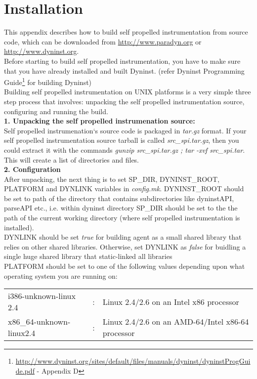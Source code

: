 \section{Installation}
This appendix describes how to build self propelled instrumentation
from source code, which can be downloaded from \url{http://www.paradyn.org}
or \url{http://www.dyninst.org}. \\


Before starting to build self propelled instrumentation, you have to make sure that you have already installed and built Dyninst. (refer Dyninst Programming Guide\footnote{\url{http://www.dyninst.org/sites/default/files/manuals/dyninst/dyninstProgGuide.pdf} - Appendix D} for building Dyninst) \\

Building self propelled instrumentation on UNIX platforms is a very simple three step process that involves: unpacking the self propelled instrumentation source, configuring and running the build. \\

\textbf{1. Unpacking the self propelled instrumenation source:} \\
Self propelled instrumenation`s source code is packaged in \textit{tar.gz} format. If your self propelled instrumentation source tarball is called \textit{src\_spi.tar.gz}, then you could extract it with the commands \textit{gunzip src\_spi.tar.gz ; tar  -xvf src\_spi.tar}. This will create a list of directories and files.  \\

\textbf{2. Configuration} \\
After unpacking, the next thing is to set SP\_DIR, DYNINST\_ROOT, PLATFORM and DYNLINK variables in \textit{config.mk}.  DYNINST\_ROOT should be set to path of the directory that contains subdirectories like dyninstAPI, parseAPI etc.,  i.e. within dyninst directory SP\_DIR should be set to the the path of the current working directory (where self propelled instrumentation is installed). \\
DYNLINK should be set \textit{true} for building agent as a small shared library that relies on other shared libraries. Otherwise, set DYNLINK as \textit{false} for buidling a single huge shared library that static-linked all libraries \\
PLATFORM should be set to one of the following values depending upon what operating system you are running on: \\
\begin{table}[h]
\begin{tabular}{l c l}
 i386-unknown-linux 2.4  & : & Linux 2.4/2.6 on an Intel x86 processor \\
 x86\_64-unknown-linux2.4&: &Linux 2.4/2.6 on an AMD-64/Intel x86-64  processor \\
\end{tabular}
\end{table}


